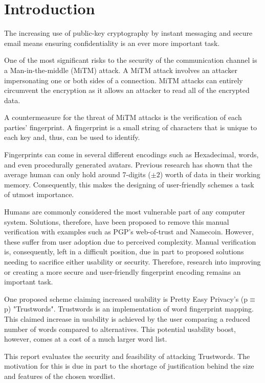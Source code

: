 \chapter{Introduction}
\label{cha:Introduction}

The increasing use of public-key cryptography by instant messaging and secure email means ensuring confidentiality is an ever more important task.

One of the most significant risks to the security of the communication channel is a Man-in-the-middle (MiTM) attack. A MiTM attack involves an attacker impersonating one or both sides of a connection. MiTM attacks can entirely circumvent the encryption as it allows an attacker to read all of the encrypted data. 

A countermeasure for the threat of MiTM attacks is the verification of each parties’ fingerprint. A fingerprint is a small string of characters that is unique to each key and, thus, can be used to identify.

Fingerprints can come in several different encodings such as Hexadecimal, words, and even procedurally generated avatars. Previous research has shown that the average human can only hold around 7-digits ($\pm 2$) worth of data in their working memory\cite{miller1956magical}. Consequently, this makes the designing of user-friendly schemes a task of utmost importance.

Humans are commonly considered the most vulnerable part of any computer system. Solutions, therefore, have been proposed to remove this manual verification with examples such as PGP's web-of-trust\cite{callas1998openpgp} and Namecoin\cite{kalodner2015empirical}. However, these suffer from user adoption due to perceived complexity. Manual verification is, consequently, left in a difficult position, due in part to proposed solutions needing to sacrifice either usability or security. Therefore, research into improving or creating a more secure and user-friendly fingerprint encoding remains an important task.

One proposed scheme claiming increased usability is Pretty Easy Privacy's (p$\equiv$p) "Trustwords". Trustwords is an implementation of word fingerprint mapping. This claimed increase in usability is achieved by the user comparing a reduced number of words compared to alternatives. This potential usability boost, however, comes at a cost of a much larger word list.

This report evaluates the security and feasibility of attacking Trustwords. The motivation for this is due in part to the shortage of justification behind the size and features of the chosen wordlist.


